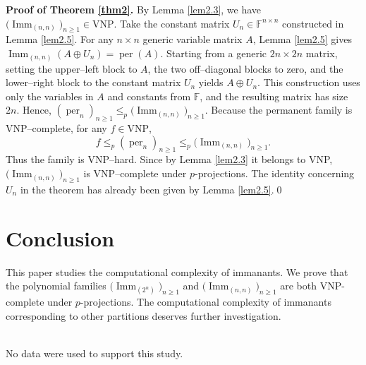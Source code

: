 \documentclass[11pt,a4paper]{article}
\begin{document}
\textbf{Proof of Theorem \ref{thm2}.}
By Lemma \ref{lem2.3}, we have $\bigl(\operatorname{Imm}_{(n,n)}\bigr)_{n\geq1}\in\mathrm{VNP}$.
Take the constant matrix $U_n\in\mathbb{F}^{n\times n}$ constructed in Lemma \ref{lem2.5}. For any $n\times n$ generic variable matrix $A$, Lemma \ref{lem2.5} gives $\operatorname{Imm}_{(n,n)}(A\oplus U_n)=\operatorname{per}(A)$.
Starting from a generic $2n\times 2n$ matrix, setting the upper–left block to $A$, the two off–diagonal blocks to zero, and the lower–right block to the constant matrix $U_n$ yields $A\oplus U_n$. This construction uses only the variables in $A$ and constants from $\mathbb{F}$, and the resulting matrix has size $2n$. Hence, 
$ (\operatorname{per}_n)_{n\geq1}\leq_p
  \bigl(\operatorname{Imm}_{(n,n)}\bigr)_{n\geq1}$.
Because the permanent family is VNP–complete, for any $f\in\mathrm{VNP}$,
\[
  f\leq_p(\operatorname{per}_n)_{n\geq1}\leq_p
  \bigl(\operatorname{Imm}_{(n,n)}\bigr)_{n\geq1}.
\]
Thus the family is VNP–hard. Since by Lemma \ref{lem2.3} it belongs to VNP, $\bigl(\operatorname{Imm}_{(n,n)}\bigr)_{n\geq1}$ is VNP–complete under $p$-projections. The identity concerning $U_n$ in the theorem has already been given by Lemma \ref{lem2.5}.\qed







\section{Conclusion}

This paper studies the computational complexity of immanants. We prove that the polynomial families $\bigl(\operatorname{Imm}_{(2^n)}\bigr)_{n\geq 1}$ and $\bigl(\operatorname{Imm}_{(n,n)}\bigr)_{n\geq 1}$ are both VNP-complete under $p$-projections. The computational complexity of immanants corresponding to other partitions deserves further investigation.

\\
{No data were used to support this study.}
\end{document}
